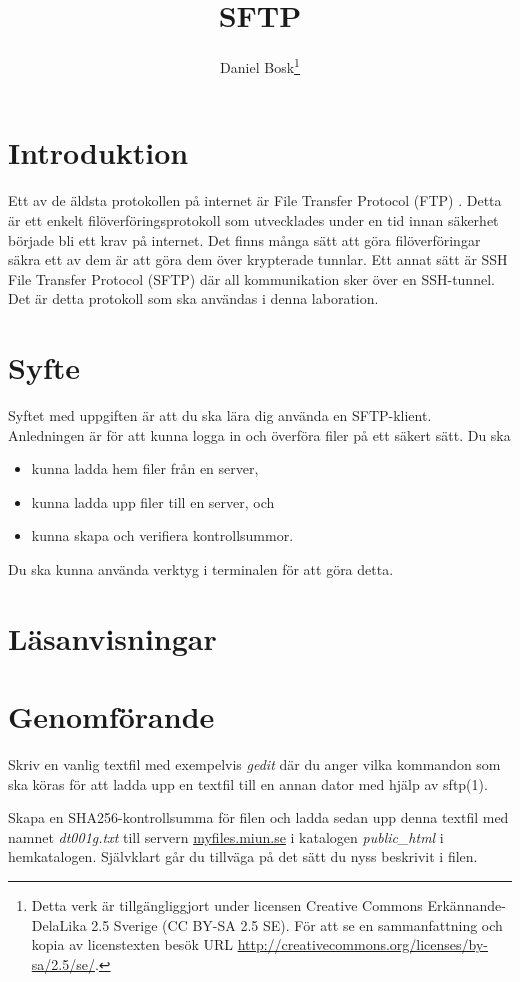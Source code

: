 \documentclass[a4paper]{miunasgn}
\title{SFTP}
\author{Daniel Bosk\footnote{%
	Detta verk är tillgängliggjort under licensen Creative Commons 
	Erkännande-DelaLika 2.5 Sverige (CC BY-SA 2.5 SE).
	För att se en sammanfattning och kopia av licenstexten besök URL 
	\url{http://creativecommons.org/licenses/by-sa/2.5/se/}.
}}
\date{\svnId}
\begin{document}
\maketitle
\thispagestyle{foot}
\tableofcontents

\section{Introduktion}
\label{sec:Introduktion}
\noindent
Ett av de äldsta protokollen på internet är File Transfer Protocol (FTP) 
\citep{rfc959}.
Detta är ett enkelt filöverföringsprotokoll som utvecklades under en tid innan 
säkerhet började bli ett krav på internet.
Det finns många sätt att göra filöverföringar säkra ett av dem är att göra dem 
över krypterade tunnlar.
Ett annat sätt är SSH File Transfer Protocol (SFTP) där all kommunikation sker 
över en SSH-tunnel.
Det är detta protokoll som ska användas i denna laboration.


\section{Syfte}
\label{sec:Syfte}
\noindent
Syftet med uppgiften är att du ska lära dig använda en SFTP-klient.
Anledningen är för att kunna logga in och överföra filer på ett säkert sätt.
Du ska
\begin{itemize}
	\item kunna ladda hem filer från en server,
	\item kunna ladda upp filer till en server, och
	\item kunna skapa och verifiera kontrollsummor.
\end{itemize}
Du ska kunna använda verktyg i terminalen för att göra detta.


\section{Läsanvisningar}
\label{sec:Lasanvisningar}
\noindent



\section{Genomförande}
\label{sec:Genomforande}
\noindent
Skriv en vanlig textfil med exempelvis \emph{gedit} där du anger vilka 
kommandon som ska köras för att ladda upp en textfil till en annan dator med 
hjälp av sftp(1).

Skapa en SHA256-kontrollsumma för filen och ladda sedan upp denna textfil med 
namnet \emph{dt001g.txt} till servern \url{myfiles.miun.se} i katalogen 
\emph{public\_html} i hemkatalogen.
Självklart går du tillväga på det sätt du nyss beskrivit i filen.
\end{document}
